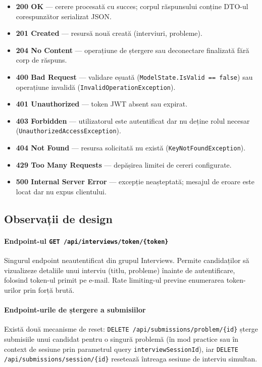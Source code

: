 \begin{itemize}
  \item \textbf{200 OK} — cerere procesată cu succes; corpul răspunsului
        conține DTO-ul corespunzător serializat JSON.
  \item \textbf{201 Created} — resursă nouă creată (interviuri, probleme).
  \item \textbf{204 No Content} — operațiune de ștergere sau deconectare
        finalizată fără corp de răspuns.
  \item \textbf{400 Bad Request} — validare eșuată
        (\texttt{ModelState.IsValid == false}) sau operațiune invalidă
        (\texttt{InvalidOperationException}).
  \item \textbf{401 Unauthorized} — token JWT absent sau expirat.
  \item \textbf{403 Forbidden} — utilizatorul este autentificat dar nu deține
        rolul necesar (\texttt{UnauthorizedAccessException}).
  \item \textbf{404 Not Found} — resursa solicitată nu există
        (\texttt{KeyNotFoundException}).
  \item \textbf{429 Too Many Requests} — depășirea limitei de cereri configurate.
  \item \textbf{500 Internal Server Error} — excepție neașteptată; mesajul
        de eroare este locat dar nu expus clientului.
\end{itemize}

\subsection{Observații de design}

\paragraph{Endpoint-ul \texttt{GET /api/interviews/token/\{token\}}}
Singurul endpoint neautentificat din grupul Interviews. Permite candidaților
să vizualizeze detaliile unui interviu (titlu, probleme) înainte de autentificare,
folosind token-ul primit pe e-mail. Rate limiting-ul previne enumerarea
token-urilor prin forță brută.

\paragraph{Endpoint-urile de ștergere a submisiilor}
Există două mecanisme de reset: \texttt{DELETE /api/submissions/problem/\{id\}}
șterge submisiile unui candidat pentru o singură problemă (în mod practice
sau în context de sesiune prin parametrul query \texttt{interviewSessionId}),
iar \texttt{DELETE /api/submissions/session/\{id\}} resetează întreaga sesiune
de interviu simultan.

